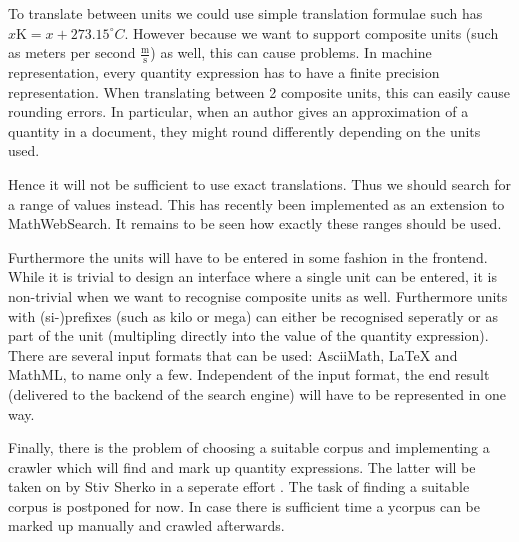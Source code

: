 \documentclass[11pt]{article}
\begin{document}
To translate between units we could use simple translation formulae such has $x \text{K} = x + 273.15 ^\circ{C} $. However because we want to support composite units (such as meters per second $\frac{\text{m}}{\text{s}}$) as well, this can cause problems. In machine representation, every quantity expression has to have a finite precision representation. When translating between 2 composite units, this can easily cause rounding errors. In particular, when an author gives an approximation of a quantity in a document, they might round differently depending on the units used.

Hence it will not be sufficient to use exact translations. Thus we should search for a range of values instead. This has recently been implemented as an extension to MathWebSearch\cite{MWS:Ranges}. It remains to be seen how exactly these ranges should be used. 

Furthermore the units will have to be entered in some fashion in the frontend. While it is trivial to design an interface where a single unit can be entered, it is non-trivial when we want to recognise composite units as well. Furthermore units with (si-)prefixes (such as kilo or mega) can either be recognised seperatly or as part of the unit (multipling directly into the value of the quantity expression). There are several input formats that can be used: AsciiMath, \LaTeX{} and MathML, to name only a few. Independent of the input format, the end result (delivered to the backend of the search engine) will have to be represented in one way.

Finally, there is the problem of choosing a suitable corpus and implementing a crawler which will find and mark up quantity expressions. The latter will be taken on by
Stiv Sherko in a seperate effort \cite{proposal:sharko}. The task of finding a suitable corpus is postponed for now. In case there is sufficient time a ycorpus can be marked up manually and crawled afterwards.

{}
\end{document}
